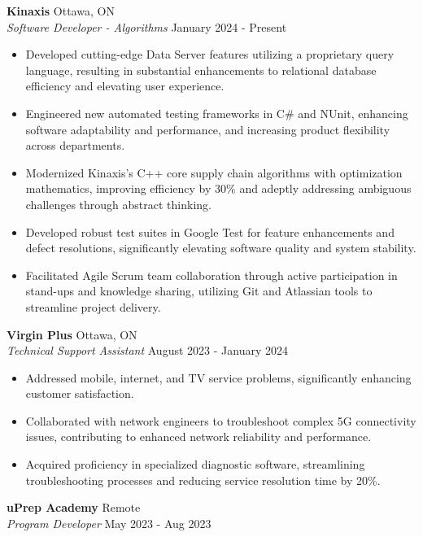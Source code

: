 \documentclass[a4paper]{article}
\begin{document}
\textbf{Kinaxis} \hfill Ottawa, ON\\
\textit{Software Developer - Algorithms} \hfill January 2024 - Present\\
\vspace{-1mm}
\begin{itemize} \itemsep 1pt

    \item Developed cutting-edge Data Server features utilizing a proprietary query language, resulting in substantial enhancements to relational database efficiency and elevating user experience.
    \item Engineered new automated testing frameworks in C\# and NUnit, enhancing software adaptability and performance, and increasing product flexibility across departments.
    \item Modernized Kinaxis's C++ core supply chain algorithms with optimization mathematics, improving efficiency by 30\% and adeptly addressing ambiguous challenges through abstract thinking.
    \item Developed robust test suites in Google Test for feature enhancements and defect resolutions, significantly elevating software quality and system stability.
    \item Facilitated Agile Scrum team collaboration through active participation in stand-ups and knowledge sharing, utilizing Git and Atlassian tools to streamline project delivery.
\end{itemize}
\textbf{Virgin Plus} \hfill Ottawa, ON\\
\textit{Technical Support Assistant} \hfill August 2023 - January 2024\\
\vspace{-1mm}
\begin{itemize} \itemsep 1pt
    \item Addressed mobile, internet, and TV service problems, significantly enhancing customer satisfaction.
    \item Collaborated with network engineers to troubleshoot complex 5G connectivity issues, contributing to enhanced network reliability and performance.
    \item 
Acquired proficiency in specialized diagnostic software, streamlining troubleshooting processes and reducing service resolution time by 20\%.
\end{itemize}
\textbf{uPrep Academy} \hfill Remote\\
\textit{Program Developer} \hfill May 2023 - Aug 2023\\
\end{document}
